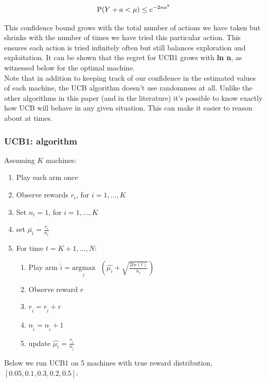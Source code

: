 \documentclass{article}
\begin{document}
$$\displaystyle \textup{P}(Y + a < \mu) \leq e^{-2na^2}$$

This confidence bound grows with the total number of actions we have taken but shrinks with the number of times we have tried this particular action. This ensures each action is tried infinitely often but still balances exploration and exploitation. It can be shown that the regret for UCB1 grows with \textbf{ln n}, as witnessed below for the optimal machine.\\

Note that in addition to keeping track of our confidence in the estimated values of each machine, the UCB algorithm doesn’t use randomness at all. Unlike the other algorithms in this paper (and in the literature) it’s possible to know exactly how UCB will behave in any given situation. This can make it easier to reason about at times.

\subsubsection{UCB1: algorithm}

Assuming $K$ machines:

\begin{enumerate}
\item Play each arm once
\item Observe rewards $r_i$, for $i = 1, ..., K$
\item Set $n_i = 1$, for $i = 1, ..., K$
\item set $\bar{\mu_{i}} = \frac{r_i}{n_i}$
\item For time $t = K+1, ..., N$:
	\begin{enumerate}
		\item Play arm $\hat{i} = \underset{i}{\text{argmax}}\text{ }(\hat{\mu_{i}} + \sqrt{\frac{2 ln (t)}{n_i}})$
		\item Observe reward $r$
		\item $r_{\hat{i}} = r_{\hat{i}} + r$
		\item $n_{\hat{i}} = n_{\hat{i}} + 1$
		\item update $\hat{\mu_{i}} = \frac{r_{\hat{i}}}{n_{\hat{i}}}$
	\end{enumerate}
\end{enumerate}

Below we run UCB1 on 5 machines with true reward distribution, $[0.05,0.1,0.3,0.2,0.5]$:
\end{document}
